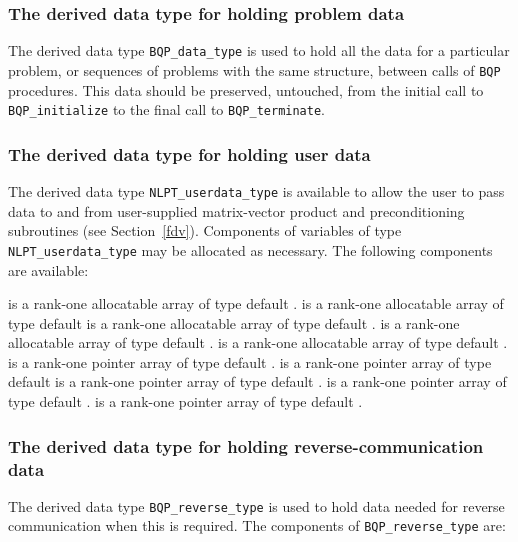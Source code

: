 \documentclass{galahad}
\newcommand{\packagename}{BQP}
\begin{document}

\subsubsection{The derived data type for holding problem data}\label{typedata}
The derived data type 
{\tt \packagename\_data\_type} 
is used to hold all the data for a particular problem,
or sequences of problems with the same structure, between calls of 
{\tt \packagename} procedures. 
This data should be preserved, untouched, from the initial call to 
{\tt \packagename\_initialize}
to the final call to
{\tt \packagename\_terminate}.


\subsubsection{The derived data type for holding user data}\label{typeuserdata}
The derived data type 
{\tt NLPT\_userdata\_type} 
is available to allow the user to pass data to and from user-supplied 
matrix-vector product and preconditioning 
subroutines (see Section~\ref{fdv}).
Components of variables of type {\tt NLPT\_userdata\-\_type} may be allocated as
necessary. The following components are available:

\begin{description}
 is a rank-one allocatable array of type default \integer.
 is a rank-one allocatable array of type default  \realdp
{} is a rank-one allocatable array of type default \complexdp.
 is a rank-one allocatable array of type default \character.
 is a rank-one allocatable array of type default \logical.
 is a rank-one pointer array of type default \integer.
 is a rank-one pointer array of type default  \realdp
{} is a rank-one pointer array of type default \complexdp.
 is a rank-one pointer array of type default \character.
 is a rank-one pointer array of type default \logical.
\end{description}


\subsubsection{The derived data type for holding reverse-communication data}\label{typereverse}
The derived data type 
{\tt \packagename\_reverse\_type} 
is used to hold data needed for reverse communication when this is
required.
The components of 
{\tt \packagename\_reverse\_type} 
are:
\end{document}
